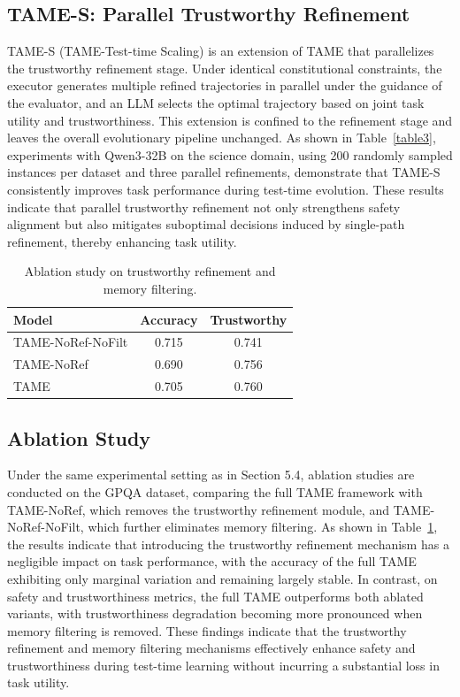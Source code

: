 \documentclass{article}
\theoremstyle{plain}
\theoremstyle{definition}
\theoremstyle{remark}
\begin{document}
\subsection{TAME-S: Parallel Trustworthy Refinement}
\label{sec:TAME-S}
TAME-S (TAME-Test-time Scaling) is an extension of TAME that parallelizes the trustworthy refinement stage. Under identical constitutional constraints, the executor generates multiple refined trajectories in parallel under the guidance of the evaluator, and an LLM selects the optimal trajectory based on joint task utility and trustworthiness. This extension is confined to the refinement stage and leaves the overall evolutionary pipeline unchanged. As shown in Table~\ref{table3}, experiments with Qwen3-32B on the science domain, using 200 randomly sampled instances per dataset and three parallel refinements, demonstrate that TAME-S consistently improves task performance during test-time evolution. These results indicate that parallel trustworthy refinement not only strengthens safety alignment but also mitigates suboptimal decisions induced by single-path refinement, thereby enhancing task utility.


\begin{table}[ht]
\centering
\caption{Ablation study on trustworthy refinement and memory filtering.}
\begin{tabular}{lcc}
\toprule
\textbf{Model} & \textbf{Accuracy} & \textbf{Trustworthy} \\
\midrule
TAME-NoRef-NoFilt &   0.715     &    0.741   \\
TAME-NoRef &    0.690   &   0.756    \\
TAME   &    0.705   &     0.760  \\
\bottomrule
\end{tabular}
\label{table4}
\end{table}


\subsection{Ablation Study}
\label{sec:ablation}
Under the same experimental setting as in Section 5.4, ablation studies are conducted on the GPQA dataset, comparing the full TAME framework with TAME-NoRef, which removes the trustworthy refinement module, and TAME-NoRef-NoFilt, which further eliminates memory filtering. As shown in Table~\ref{table4}, the results indicate that introducing the trustworthy refinement mechanism has a negligible impact on task performance, with the accuracy of the full TAME exhibiting only marginal variation and remaining largely stable. In contrast, on safety and trustworthiness metrics, the full TAME outperforms both ablated variants, with trustworthiness degradation becoming more pronounced when memory filtering is removed. These findings indicate that the trustworthy refinement and memory filtering mechanisms effectively enhance safety and trustworthiness during test-time learning without incurring a substantial loss in task utility.
\end{document}
